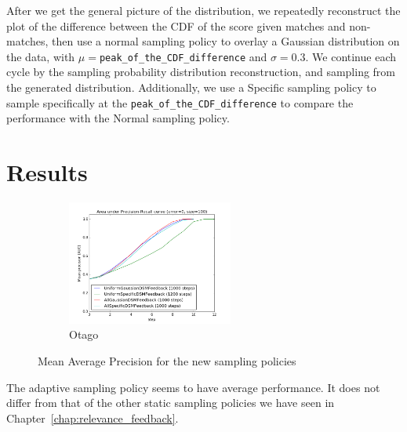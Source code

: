 After we get the general picture of the distribution, we repeatedly reconstruct
the plot of the difference between the CDF of the score given matches and
non-matches, then use a normal sampling policy to overlay a Gaussian
distribution on the data, with $\mu=$\texttt{peak\_of\_the\_CDF\_difference} and
$\sigma=0.3$. We continue each cycle by the sampling probability
distribution reconstruction, and sampling from the generated distribution.
Additionally, we use a Specific sampling policy to sample specifically at
the \texttt{peak\_of\_the\_CDF\_difference} to compare the performance with the
Normal sampling policy.

\section{Results}

\begin{figure}[htb]
  \centering
  \begin{subfigure}[t]{\textwidth}
    \centering
    \includegraphics[width=0.6\textwidth]{otago}
    \caption{Otago}
  \end{subfigure}
  \caption{Mean Average Precision for the new sampling policies}
  \label{fig:adaptive_aoc} %
\end{figure}

The adaptive sampling policy seems to have average performance. It
does not differ from that of the other static sampling policies we have seen in
Chapter~\ref{chap:relevance_feedback}.

